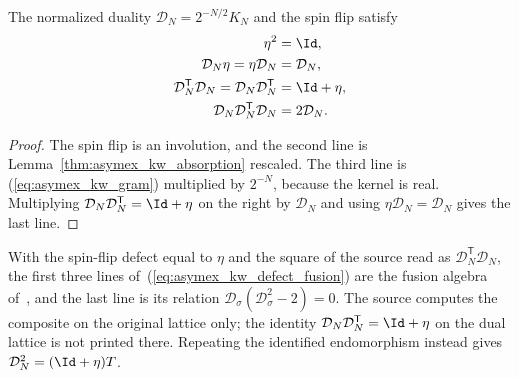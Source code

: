 \begin{lemma}
    \label{prop:asymex_kw_defect_fusion}
    \leanok
    The normalized duality $\mathcal D_N=2^{-N/2}K_N$ and the spin flip
    satisfy
    \begin{align}
        \eta^2                                           & =\Id,
        \notag                                                             \\
        \mathcal D_N\eta=\eta\mathcal D_N                & =\mathcal D_N,
        \notag                                                             \\
        \mathcal D_N^{\mathsf T}\mathcal D_N
        =\mathcal D_N\mathcal D_N^{\mathsf T}            & =\Id+\eta,
        \notag                                                             \\
        \mathcal D_N\mathcal D_N^{\mathsf T}\mathcal D_N & =2\mathcal D_N.
        \label{eq:asymex_kw_defect_fusion}
    \end{align}
\end{lemma}

\begin{proof}
    \leanok
    The spin flip is an involution, and the second line is
    Lemma~\ref{thm:asymex_kw_absorption} rescaled. The third line is
    (\ref{eq:asymex_kw_gram}) multiplied by $2^{-N}$, because the kernel
    is real. Multiplying $\mathcal D_N\mathcal D_N^{\mathsf T}=\Id+\eta$
    on the right by $\mathcal D_N$ and using $\eta\mathcal D_N=\mathcal
        D_N$ gives the last line.
\end{proof}

With the spin-flip defect equal to $\eta$ and the square of the source
read as $\mathcal D_N^{\mathsf T}\mathcal D_N$, the first three lines
of~(\ref{eq:asymex_kw_defect_fusion}) are the fusion algebra
of~\cite{Aasen2016Topological}, and the last line is its relation
$\mathcal D_\sigma(\mathcal D_\sigma^2-2)=0$. The source computes the
composite on the original lattice only; the identity
$\mathcal D_N\mathcal D_N^{\mathsf T}=\Id+\eta$ on the dual lattice is
not printed there. Repeating the identified endomorphism instead gives
$\mathcal D_N^2=(\Id+\eta)T$.

